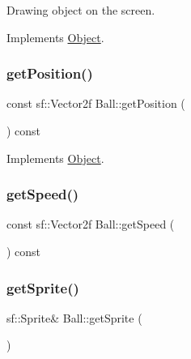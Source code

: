 Drawing object on the screen. 



Implements \mbox{\hyperlink{class_object_af9862406dcd271bd45580737df468af4}{Object}}.

\mbox{\label{class_ball_a672da3b511f6b30fde82a63927fe8174}} 
\subsubsection{\texorpdfstring{getPosition()}{getPosition()}}
{\footnotesize\ttfamily const sf\+::\+Vector2f Ball\+::get\+Position (\begin{DoxyParamCaption}{ }\end{DoxyParamCaption}) const\hspace{0.3cm}{\ttfamily [virtual]}}



Implements \mbox{\hyperlink{class_object_a3fd6370b8cfc53e5e41d09704726c2d4}{Object}}.

\mbox{\label{class_ball_a9986943aa6685d80f65d441dd68c2e69}} 
\subsubsection{\texorpdfstring{getSpeed()}{getSpeed()}}
{\footnotesize\ttfamily const sf\+::\+Vector2f Ball\+::get\+Speed (\begin{DoxyParamCaption}{ }\end{DoxyParamCaption}) const\hspace{0.3cm}{\ttfamily [inline]}}

\mbox{\label{class_ball_a2f85e93bd6650f5c5cbf4a0dbd961ca4}} 
\subsubsection{\texorpdfstring{getSprite()}{getSprite()}}
{\footnotesize\ttfamily sf\+::\+Sprite\& Ball\+::get\+Sprite (\begin{DoxyParamCaption}{ }\end{DoxyParamCaption})\hspace{0.3cm}{\ttfamily [inline]}}

